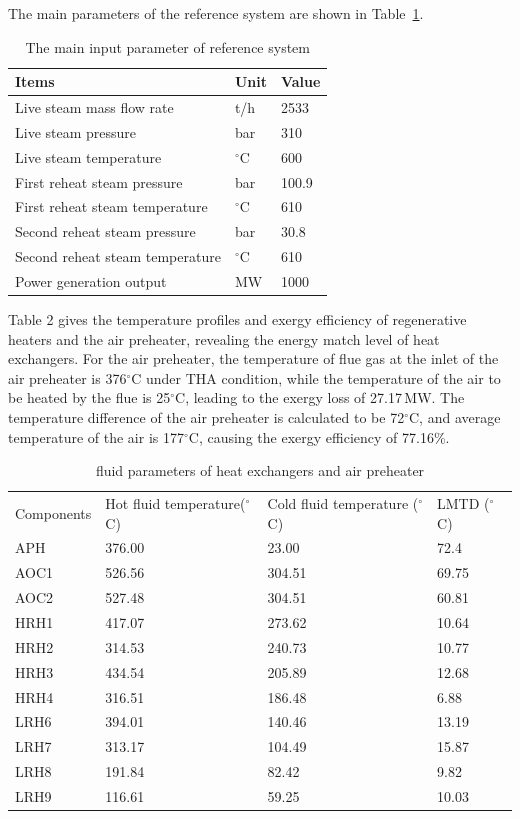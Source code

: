 \documentclass[preprint,12pt]{elsarticle}
\begin{document}
The main  parameters of the reference system are shown in Table~\ref{tab:ref input}.

\begin{table}[htbp]
\caption{The main input parameter of reference system }
\label{tab:ref input}
\centering
\begin{tabular}{lll}
\toprule 
Items & Unit & Value\tabularnewline
\midrule
 Live steam mass flow rate 	    	&t/h 			&2533 \\
 Live steam pressure 		    	&bar 			&310\\
 Live steam temperature		     	&$^\circ$C		&600		\\
 First reheat steam pressure    	&bar			&100.9		\\
 First reheat steam temperature  	&$^\circ$C		&610		\\
 Second reheat steam pressure    	&bar			&30.8		\\
 Second reheat steam temperature 	&$^\circ$C		&610		\\
 Power generation output 			&MW				&1000		\\
\bottomrule
\end{tabular}	
\end{table}
Table 2 gives the temperature profiles and exergy efficiency of regenerative heaters and the air preheater, revealing the energy match level of heat exchangers.
For the air preheater, the temperature of flue gas at the inlet of the air preheater is 376$^\circ$C under THA condition, while the temperature of the air to be heated by the flue is 25$^\circ$C, leading to the exergy loss of 27.17\,MW. The temperature difference of the air preheater is calculated to be 72$^\circ$C, and average temperature of the air is 177$^\circ$C, causing the exergy efficiency of 77.16\%.
\begin{table}[htbp]
\caption{fluid parameters of heat exchangers and air preheater}
\label{tab:reheater parameter}
\centering
\begin{tabular}{llll}
\toprule 
\multirow{2}{2cm}{Components} &\multirow{2}{2.7cm}{Hot fluid temperature($^\circ$C)}  & \multirow{2}{3.2cm}{Cold fluid temperature ($^\circ$C)}&\multirow{2}{2.5cm}{LMTD ($^\circ$C)}\tabularnewline
&&&\tabularnewline
\midrule
APH  &  376.00 	& 23.00  & 72.4\tabularnewline
AOC1 &   526.56 & 304.51 & 69.75\tabularnewline
AOC2 &  527.48 	& 304.51 & 60.81\tabularnewline
HRH1 &   417.07 & 273.62 & 10.64\tabularnewline
HRH2 &   314.53 & 240.73 & 10.77\tabularnewline
HRH3 &   434.54 & 205.89 & 12.68\tabularnewline
HRH4 &   316.51 & 186.48 & 6.88\tabularnewline
LRH6 &  394.01 	& 140.46 & 13.19\tabularnewline
LRH7 &   313.17 & 104.49 & 15.87\tabularnewline
LRH8 &   191.84 & 82.42  & 9.82\tabularnewline
LRH9 &   116.61 & 59.25  & 10.03\tabularnewline
\bottomrule
\end{tabular}
\end{table}
\end{document}
